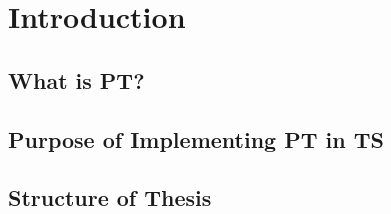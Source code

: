 
\chapter{Introduction}\label{ch:introduction}

\section{What is PT?}\label{sec:what-is-pt?}


\section{Purpose of Implementing PT in TS}\label{sec:purpose-of-implementing-pt-in-ts}


\section{Structure of Thesis}\label{sec:structure-of-thesis}
